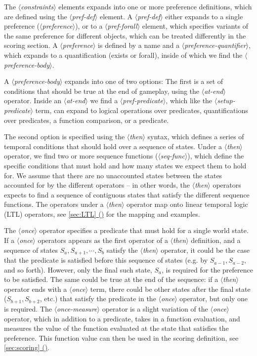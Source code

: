 \documentclass{article}
\newcommand{\dsl}[1]{{\it $\langle$#1$\rangle$}}
\newcommand*{\fullref}[1]{\hyperref[{#1}]{\autoref*{#1} (\nameref*{#1})}} %
\begin{document}
The \dsl{constraints} elements expands into one or more preference definitions, which are defined using the \dsl{pref-def} element. 
A \dsl{pref-def} either expands to a single preference (\dsl{preference}), or to a \dsl{pref-forall} element, which specifies variants of the same preference for different objects, which can be treated differently in the scoring section. 
A \dsl{preference} is defined by a name and a \dsl{preference-quantifier}, which expands to a quantification (exists or forall), inside of which we find the \dsl{preference-body}.

A \dsl{preference-body} expands into one of two options:
The first is a set of conditions that should be true at the end of gameplay, using the \dsl{at-end} operator. 
Inside an \dsl{at-end} we find a \dsl{pref-predicate}, which like the \dsl{setup-predicate} term, can expand to logical operations over predicates, quantifications over predicates, a function comparison, or a predicate.

The second option is specified using the \dsl{then} syntax, which defines a series of temporal conditions that should hold over a sequence of states. 
Under a \dsl{then} operator, we find two or more sequence functions (\dsl{seq-func}), which define the specific conditions that must hold and how many states we expect them to hold for. 
We assume that there are no unaccounted states between the states accounted for by the different operators -- in other words, the \dsl{then} operators expects to find a sequence of contiguous states that satisfy the different sequence functions. 
The operators under a \dsl{then} operator map onto linear temporal logic (LTL) operators, see \fullref{sec:LTL} for the mapping and examples. 


The \dsl{once} operator specifies a predicate that must hold for a single world state. 
If a \dsl{once} operators appears as the first operator of a \dsl{then} definition, and a sequence of states $S_a, S_{a+1}, \cdots, S_b$ satisfy the \dsl{then} operator, it could be the case that the predicate is satisfied before this sequence of states (e.g. by $S_{a-1}, S_{a-2}$, and so forth). 
However, only the final such state, $S_a$, is required for the preference to be satisfied.
The same could be true at the end of the sequence: if a \dsl{then} operator ends with a \dsl{once} term, there could be other states after the final state ($S_{b+1}, S_{b+2}$, etc.) that satisfy the predicate in the \dsl{once} operator, but only one is required. 
The \dsl{once-measure} operator is a slight variation of the \dsl{once} operator, which in addition to a predicate, takes in a function evaluation, and measures the value of the function evaluated at the state that satisfies the preference.
This function value can then be used in the scoring definition, see \fullref{sec:scoring}.
\end{document}
